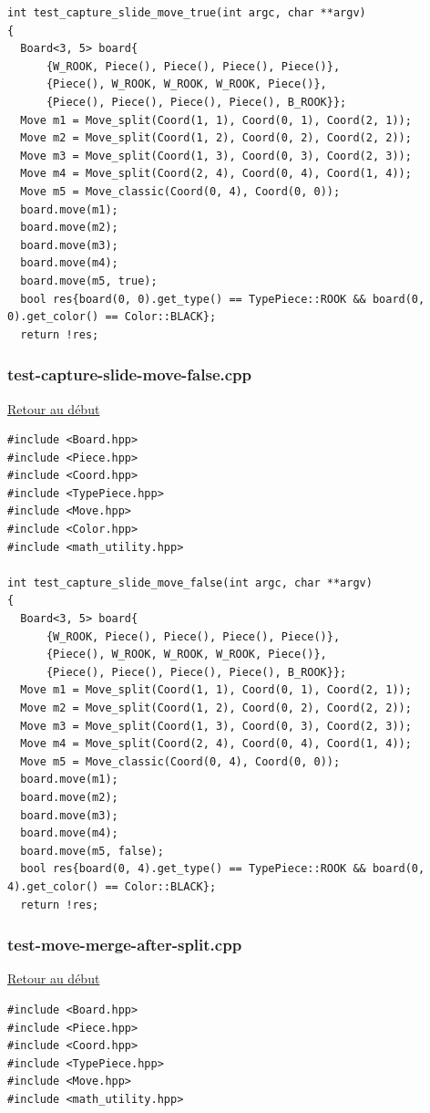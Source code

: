 {\begin{frame}[fragile]
\begin{verbatim}
int test_capture_slide_move_true(int argc, char **argv)
{
  Board<3, 5> board{
      {W_ROOK, Piece(), Piece(), Piece(), Piece()},
      {Piece(), W_ROOK, W_ROOK, W_ROOK, Piece()},
      {Piece(), Piece(), Piece(), Piece(), B_ROOK}};
  Move m1 = Move_split(Coord(1, 1), Coord(0, 1), Coord(2, 1));
  Move m2 = Move_split(Coord(1, 2), Coord(0, 2), Coord(2, 2));
  Move m3 = Move_split(Coord(1, 3), Coord(0, 3), Coord(2, 3));
  Move m4 = Move_split(Coord(2, 4), Coord(0, 4), Coord(1, 4));
  Move m5 = Move_classic(Coord(0, 4), Coord(0, 0));
  board.move(m1);
  board.move(m2);
  board.move(m3);
  board.move(m4);
  board.move(m5, true);
  bool res{board(0, 0).get_type() == TypePiece::ROOK && board(0, 0).get_color() == Color::BLACK};
  return !res;

\end{verbatim}
\end{frame}

\begin{frame}[fragile]
\label{testcaptureslidemovefalse.cpp}
\frametitle{test-capture-slide-move-false.cpp}
\hyperlink{conclusion}{Retour au début}\newline
\begin{verbatim}
#include <Board.hpp>
#include <Piece.hpp>
#include <Coord.hpp>
#include <TypePiece.hpp>
#include <Move.hpp>
#include <Color.hpp>
#include <math_utility.hpp>

int test_capture_slide_move_false(int argc, char **argv)
{
  Board<3, 5> board{
      {W_ROOK, Piece(), Piece(), Piece(), Piece()},
      {Piece(), W_ROOK, W_ROOK, W_ROOK, Piece()},
      {Piece(), Piece(), Piece(), Piece(), B_ROOK}};
  Move m1 = Move_split(Coord(1, 1), Coord(0, 1), Coord(2, 1));
  Move m2 = Move_split(Coord(1, 2), Coord(0, 2), Coord(2, 2));
  Move m3 = Move_split(Coord(1, 3), Coord(0, 3), Coord(2, 3));
  Move m4 = Move_split(Coord(2, 4), Coord(0, 4), Coord(1, 4));
  Move m5 = Move_classic(Coord(0, 4), Coord(0, 0));
  board.move(m1);
  board.move(m2);
  board.move(m3);
  board.move(m4);
  board.move(m5, false);
  bool res{board(0, 4).get_type() == TypePiece::ROOK && board(0, 4).get_color() == Color::BLACK};
  return !res;

\end{verbatim}
\end{frame}

\begin{frame}[fragile]
\label{testmovemergeaftersplit.cpp}
\frametitle{test-move-merge-after-split.cpp}
\hyperlink{conclusion}{Retour au début}\newline
\begin{verbatim}
#include <Board.hpp>
#include <Piece.hpp>
#include <Coord.hpp>
#include <TypePiece.hpp>
#include <Move.hpp>
#include <math_utility.hpp>


\end{verbatim}
\end{frame}}
